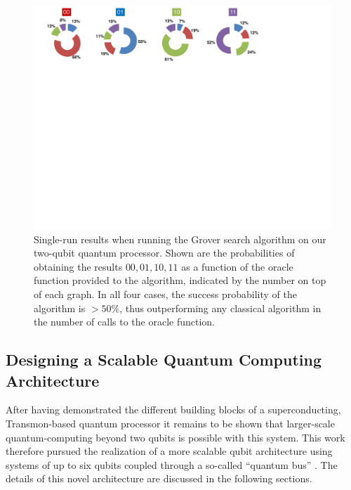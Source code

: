 \begin{figure}[ht!]
		\centering
		\includegraphics[width=1.0\textwidth]{./material/papers/grover/figures/grover_algorithm_single_shot_probabilities}
	\caption[Single-run results of the Grover search algorithm]{Single-run results when running the Grover search algorithm on our two-qubit quantum processor. Shown are the probabilities of obtaining the results $00,01,10,11$ as a function of the oracle function provided to the algorithm, indicated by the number on top of each graph. In all four cases, the success probability of the algorithm is $> 50 \%$, thus outperforming any classical algorithm in the number of calls to the oracle function.}
	\label{fig:grover_single_shot_probabilities}
\end{figure}

\subsection{Designing a Scalable Quantum Computing Architecture}

After having demonstrated the different building blocks of a superconducting, Transmon-based quantum processor it remains to be shown that larger-scale quantum-computing beyond two qubits is possible with this system. This work therefore pursued the realization of a more scalable qubit architecture using systems of up to six qubits coupled through a so-called ``quantum bus'' \citep{majer_coupling_2007}. The details of this novel architecture are discussed in the following sections.


